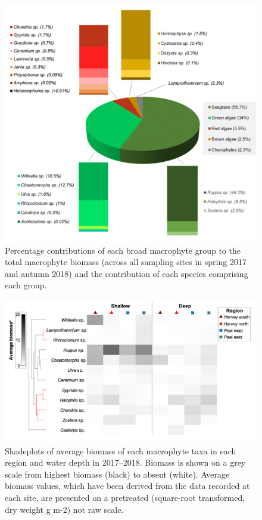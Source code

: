 \documentclass[
]{book}
\begin{document}
\begin{figure}
\includegraphics[width=1\linewidth]{images/macrophytes/picture14} \caption{Percentage contributions of each broad macrophyte group to the total macrophyte biomass (across all sampling sites in spring 2017 and autumn 2018) and the contribution of each species comprising each group.}\label{fig:macrophytes-pic14}
\end{figure}

\begin{figure}
\includegraphics[width=1\linewidth]{images/macrophytes/picture15} \caption{Shadeplots of average biomass of each macrophyte taxa in each region and water depth in 2017–2018. Biomass is shown on a grey scale from highest biomass (black) to absent (white). Average biomass values, which have been derived from the data recorded at each site, are presented on a pretreated (square-root transformed, dry weight g m-2) not raw scale.}\label{fig:macrophytes-pic15}
\end{figure}
\end{document}
